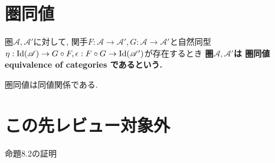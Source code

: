 \section{圏同値}
\begin{Def}
圏$\mathscr{A},\mathscr{A}'$に対して, 関手$F:\mathscr{A}\rightarrow\mathscr{A}', G:\mathscr{A}\rightarrow\mathscr{A}'$と自然同型$\eta:\mathrm{Id}(\mathscr{A})\rightarrow G\circ F,\epsilon:F\circ G\rightarrow\rm{Id}(\mathscr{A}')$が存在するとき
\bf{圏$\mathscr{A},\mathscr{A}'$は
圏同値 equivalence of categories
である}という.
\end{Def}
\begin{Prop}
圏同値は同値関係である.
\end{Prop}

\begin{comment}
\section{Haskにおける自然同型}
\subsection{mirror関数}
Tree関手からTree関手への自然同型
\subsection{Maybe関手とEither()関手の間の自然同型}
\section{まとめ}
aa
\end{comment}

\section{この先レビュー対象外}
命題8.2の証明